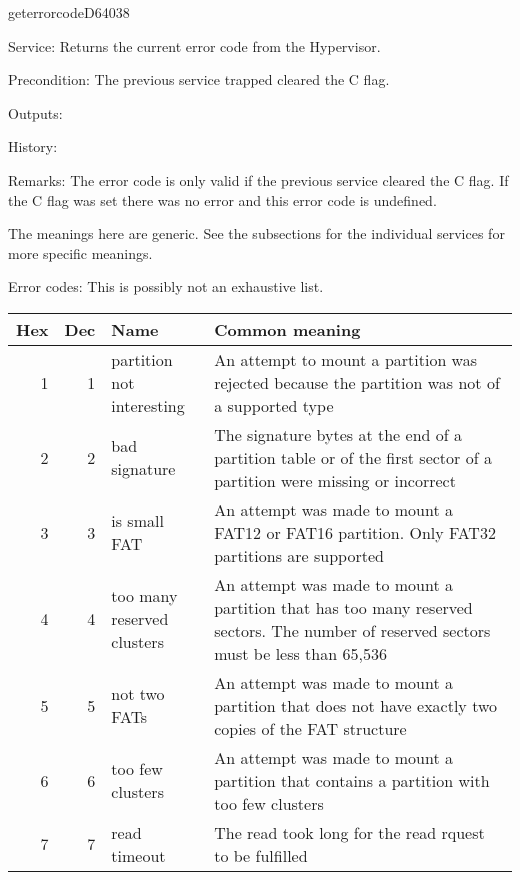 \begin{hyppotrap}{geterrorcode}{D640}{38}
\item [Service:]
  Returns the current error code from the Hypervisor.
\item [Precondition:]
  The previous service trapped cleared the C flag.
\item [Outputs:]
\item [History:]
\item [Remarks:]
  The error code is only valid if the previous service cleared the C flag.
  If the C flag was set there was no error and this error code is undefined.

  The meanings here are generic. See the subsections for the individual services
  for more specific meanings.
\item [Error codes:] This is possibly not an exhaustive list.
{
  \begin{longtable}{|r|r|l|p{8cm}|}
    \hline
    \textbf{Hex} & \textbf{Dec} & \textbf{Name} & \textbf{Common meaning}\\
    \hline
    \endhead
    1 & 1 & \makecell[tl]{partition not \\ interesting} &
    An attempt to mount a partition was rejected because the partition was not
    of a supported type
    \\\hline
    2 & 2 & bad signature &
    The signature bytes at the end of a partition table or of the first sector
    of a partition were missing or incorrect
    \\\hline
    3 & 3 & is small FAT &
    An attempt was made to mount a FAT12 or FAT16 partition. Only FAT32
    partitions are supported
    \\\hline
    4 & 4 & \makecell[tl]{too many reserved\\clusters} &
    An attempt was made to mount a partition that has too many reserved sectors.
    The number of reserved sectors must be less than 65,536
    \\\hline
    5 & 5 & not two FATs &
    An attempt was made to mount a partition that does not have exactly two
    copies of the FAT structure
    \\\hline
    6 & 6 & too few clusters &
    An attempt was made to mount a partition that contains a partition with too
    few clusters
    \\\hline
    7 & 7 & read timeout &
    The read took long for the read rquest to be fulfilled

\end{longtable}}
\end{hyppotrap}
